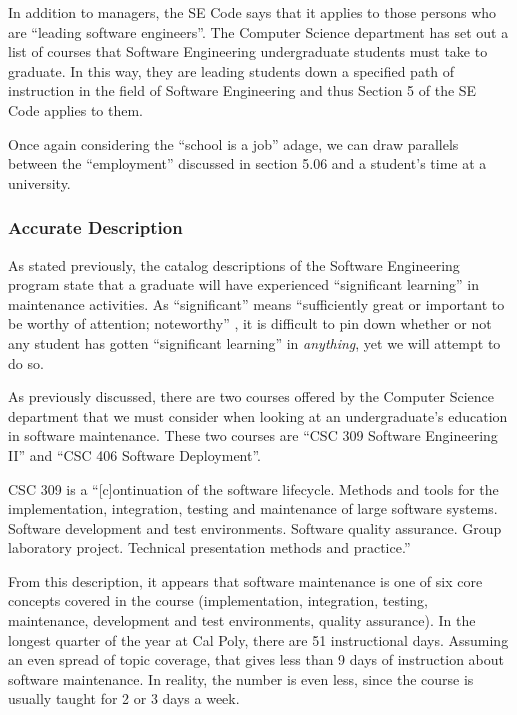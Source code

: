\documentclass[11pt]{article}
\begin{document}
\begin{multicols}{2}
In addition to managers, the SE Code says that it applies to those persons who are ``leading software engineers''.  The Computer Science department has set out a list of courses that Software Engineering undergraduate students must take to graduate. \cite{catalogDegree}  In this way, they are leading students down a specified path of instruction in the field of Software Engineering and thus Section 5 of the SE Code applies to them.

Once again considering the ``school is a job'' adage, we can draw parallels between the ``employment'' discussed in section 5.06 and a student's time at a university.

\subsubsection{Accurate Description}

As stated previously, the catalog descriptions of the Software Engineering program state that a graduate will have experienced ``significant learning'' in maintenance activities. \cite{catalogDept}  As ``significant'' means ``sufficiently great or important to be worthy of attention; noteworthy'' \cite{definitionSignificant}, it is difficult to pin down whether or not any student has gotten ``significant learning'' in \emph{anything}, yet we will attempt to do so.

As previously discussed, there are two courses offered by the Computer Science department that we must consider when looking at an undergraduate's education in software maintenance.  These two courses are ``CSC 309 Software Engineering II'' and ``CSC 406 Software Deployment''.

CSC 309 is a ``[c]ontinuation of the software lifecycle. Methods and tools for the implementation, integration, testing and maintenance of large software systems. Software development and test environments. Software quality assurance. Group laboratory project. Technical presentation methods and practice.'' \cite{catalogCourses}

From this description, it appears that software maintenance is one of six core concepts covered in the course (implementation, integration, testing, maintenance, development and test environments, quality assurance).  In the longest quarter of the year at Cal Poly, there are 51 instructional days. \cite{polyCalendar}  Assuming an even spread of topic coverage, that gives less than 9 days of instruction about software maintenance.  In reality, the number is even less, since the course is usually taught for 2 or 3 days a week. \cite{309Schedule}


\end{multicols}
\end{document}
